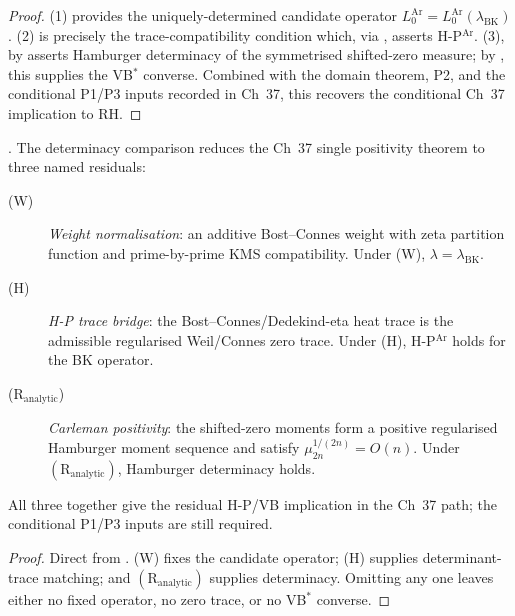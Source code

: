 \begin{proof}
(1) provides the uniquely-determined candidate operator
\(L_{0}^{\mathrm{Ar}}=L_{0}^{\mathrm{Ar}}(\lambda_{\mathrm{BK}})\).
(2) is precisely the trace-compatibility condition which, via
, asserts
H-P\(^{\mathrm{Ar}}\). (3), by
 asserts
Hamburger determinacy of the symmetrised shifted-zero measure;
by
,
this supplies the VB\(^{*}\) converse. Combined with the domain theorem,
P2, and the conditional P1/P3 inputs recorded in Ch~37, this recovers
the conditional Ch~37 implication to RH.
\end{proof}

\begin{corollary}
\label{v4-arith:hpar-det:cor:wave3-structure}
\ClaimStatusProvedHere. The determinacy comparison reduces the Ch~37 single positivity
theorem to three named residuals:
\begin{description}
\item[(\(\mathrm{W}\))] \emph{Weight normalisation}: an additive
Bost--Connes weight with zeta partition function and prime-by-prime
KMS compatibility. Under (W), \(\lambda=\lambda_{\mathrm{BK}}\).
\item[(\(\mathrm{H}\))] \emph{H-P trace bridge}: the
Bost--Connes/Dedekind-eta heat trace is the admissible regularised
Weil/Connes zero trace. Under (H), H-P\(^{\mathrm{Ar}}\) holds for the
BK operator.
\item[(\(\mathrm{R}_{\mathrm{analytic}}\))] \emph{Carleman positivity}:
the shifted-zero moments form a positive regularised Hamburger moment
sequence and satisfy \(\mu_{2n}^{1/(2n)}=O(n)\). Under
\((\mathrm{R}_{\mathrm{analytic}})\), Hamburger determinacy holds.
\end{description}
All three together give the residual H-P/VB implication in the
Ch~37 path; the conditional P1/P3 inputs are still required.
\end{corollary}

\begin{proof}
Direct from . (W) fixes
the candidate operator; (H) supplies determinant-trace matching; and
\((\mathrm{R}_{\mathrm{analytic}})\) supplies determinacy. Omitting any
one leaves either no fixed operator, no zero trace, or no VB\(^{*}\)
converse.
\end{proof}

